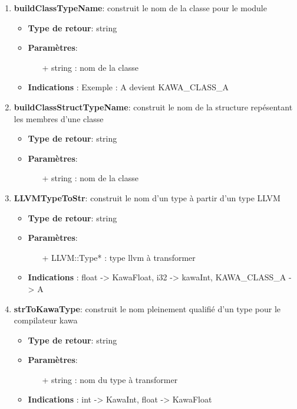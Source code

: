 \documentclass{article}
\begin{document}
\begin{enumerate}
   \item \textbf{buildClassTypeName}: construit le nom de la classe pour le module
   \begin{itemize}
     \item \textbf{Type de retour}: string
     \item \textbf{Paramètres}:
     \begin{enumerate}
       \item[+] string : nom de la classe
     \end{enumerate}
     \item \textbf{Indications} : Exemple : A devient KAWA\_CLASS\_A
   \end{itemize}

   \item \textbf{buildClassStructTypeName}: construit le nom de la structure repésentant les membres d'une classe
   \begin{itemize}
     \item \textbf{Type de retour}: string
     \item \textbf{Paramètres}:
     \begin{enumerate}
       \item[+] string : nom de la classe
     \end{enumerate}
   \end{itemize}

   \item \textbf{LLVMTypeToStr}: construit le nom d'un type à partir d'un type LLVM
   \begin{itemize}
     \item \textbf{Type de retour}: string
     \item \textbf{Paramètres}:
     \begin{enumerate}
       \item[+] LLVM::Type* : type llvm à transformer
     \end{enumerate}
     \item \textbf{Indications} : float -> KawaFloat, i32 -> kawaInt, KAWA\_CLASS\_A -> A
   \end{itemize}

   \item \textbf{strToKawaType}: construit le nom pleinement qualifié d'un type pour le compilateur kawa
   \begin{itemize}
     \item \textbf{Type de retour}: string
     \item \textbf{Paramètres}:
     \begin{enumerate}
       \item[+] string : nom du type à transformer
     \end{enumerate}
     \item \textbf{Indications} : int -> KawaInt, float -> KawaFloat
   \end{itemize}

   \end{enumerate}
\end{document}
